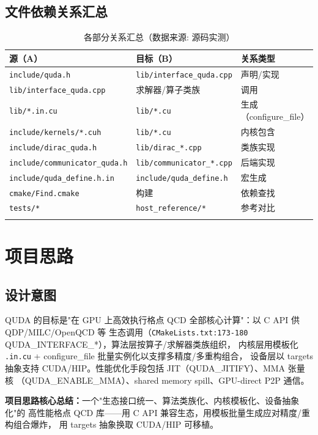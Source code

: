 \documentclass[UTF8]{ctexart}
\begin{document}
\subsection{文件依赖关系汇总}
\begin{xltabular}{\textwidth}{lXX}
\toprule
\textcolor{relation}{源（A）} & 目标（B） & 关系类型 \\
\midrule
\endhead
\nolinkurl{include/quda.h} & \nolinkurl{lib/interface_quda.cpp} & 声明/实现 \\
\nolinkurl{lib/interface_quda.cpp} & 求解器/算子类族 & 调用 \\
\texttt{lib/*.in.cu} & \texttt{lib/*.cu} & 生成（configure\_file）\\
\nolinkurl{include/kernels/*.cuh} & \texttt{lib/*.cu} & 内核包含 \\
\nolinkurl{include/dirac_quda.h} & \nolinkurl{lib/dirac_*.cpp} & 类族实现 \\
\nolinkurl{include/communicator_quda.h} & \nolinkurl{lib/communicator_*.cpp} & 后端实现 \\
\nolinkurl{include/quda_define.h.in} & \nolinkurl{include/quda_define.h} & 宏生成 \\
\texttt{cmake/Find\*.cmake} & 构建 & 依赖查找 \\
\texttt{tests/*} & \nolinkurl{host_reference/*} & 参考对比 \\
\bottomrule
\caption{各部分关系汇总（数据来源: 源码实测）}
\end{xltabular}

\section{项目思路}

\subsection{设计意图}
QUDA 的目标是"在 GPU 上高效执行格点 QCD 全部核心计算"：以 C API 供 QDP/MILC/OpenQCD 等
生态调用（\texttt{CMakeLists.txt:173-180} QUDA\_INTERFACE\_*），算法层按算子/求解器类族组织，
内核层用模板化 \texttt{.in.cu} + configure\_file 批量实例化以支撑多精度/多重构组合，
设备层以 targets 抽象支持 CUDA/HIP。性能优化手段包括 JIT（QUDA\_JITIFY）、MMA 张量核
（QUDA\_ENABLE\_MMA）、shared memory spill、GPU-direct P2P 通信。

\begin{ideabox}
\textbf{项目思路核心总结：}一个"生态接口统一、算法类族化、内核模板化、设备抽象化"的
高性能格点 QCD 库——用 C API 兼容生态，用模板批量生成应对精度/重构组合爆炸，
用 targets 抽象换取 CUDA/HIP 可移植。
\end{ideabox}
\end{document}
